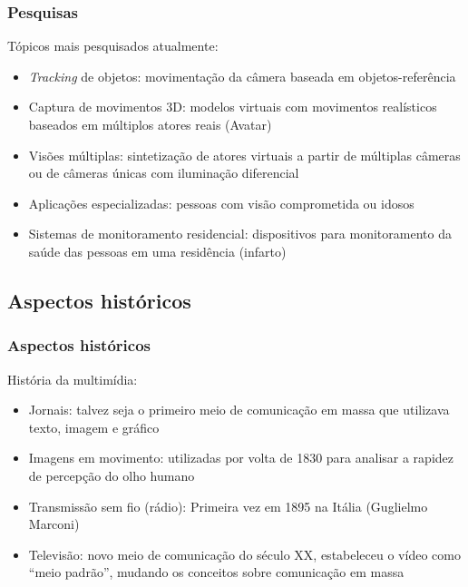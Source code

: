 \documentclass[xcolor]{beamer}
\begin{document}
\begin{frame}
    \frametitle{Pesquisas}

    Tópicos mais pesquisados atualmente:

    \begin{itemize}
        \item \alert{{\it Tracking} de objetos}: movimentação da câmera baseada
em objetos-referência
        \item \alert{Captura de movimentos 3D}: modelos virtuais com movimentos
realísticos baseados em múltiplos atores reais (Avatar)
        \item \alert{Visões múltiplas}: sintetização de atores virtuais a partir
de múltiplas câmeras ou de câmeras únicas com iluminação diferencial
        \item \alert{Aplicações especializadas}: pessoas com visão comprometida
ou idosos
        \item \alert{Sistemas de monitoramento residencial}: dispositivos para
monitoramento da saúde das pessoas em uma residência (infarto)
    \end{itemize}
\end{frame}

\subsection{Aspectos históricos}
\begin{frame}
    \frametitle{Aspectos históricos}

    História da multimídia:

    \begin{itemize}
        \item Jornais: talvez seja o primeiro meio de comunicação em massa que
utilizava texto, imagem e gráfico
        \item Imagens em movimento: utilizadas por volta de 1830 para analisar a
rapidez de percepção do olho humano
        \item Transmissão sem fio (rádio): Primeira vez em 1895 na Itália
(Guglielmo Marconi)
        \item Televisão: novo meio de comunicação do século XX, estabeleceu o
vídeo como ``meio padrão'', mudando os conceitos sobre comunicação em massa
    \end{itemize}
\end{frame}
\end{document}
